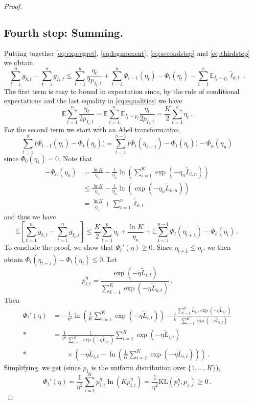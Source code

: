 \documentclass[11pt]{hackednow}
\newcommand{\K}{\mathrm{KL}}
\newcommand{\E}{\mathbb{E}}
\renewcommand{\tilde}{\widetilde}
\begin{document}
\begin{proof}
\subsection*{Fourth step: Summing.}
%
Putting together \eqref{eq:expregret}, \eqref{eq:logmoment}, \eqref{eq:secondstep} and \eqref{eq:thirdstep} we obtain
$$\sum_{t=1}^n g_{k,t} - \sum_{t=1}^n g_{I_t,t} \leq \sum_{t=1}^n \frac{\eta_t}{2 p_{I_t,t}} + \sum_{t=1}^n \Phi_{t-1}(\eta_t) - \Phi_t(\eta_t) - \sum_{t=1}^n \E_{I_t \sim p_t} \tilde{\ell}_{k,t}~.$$
The first term is easy to bound in expectation since, by the rule of conditional expectations and the last equality in \eqref{eq:equalities} we have
$$\E \sum_{t=1}^n \frac{\eta_t}{2 p_{I_t,t}} = \E \sum_{t=1}^n \E_{I_t \sim p_t} \frac{\eta_t}{2 p_{I_t,t}} = \frac{K}{2} \sum_{t=1}^n \eta_t~.$$
For the second term we start with an Abel transformation,
$$\sum_{t=1}^n \bigl(\Phi_{t-1}(\eta_t) - \Phi_t(\eta_t)\bigr) = \sum_{t=1}^{n-1} \bigl(\Phi_t(\eta_{t+1}) - \Phi_t(\eta_t)\bigr) - \Phi_n(\eta_n)$$
since $\Phi_0(\eta_1)=0$. Note that
\begin{align*}
- \Phi_n(\eta_n) & = \frac{\ln K}{\eta_n} - \frac{1}{\eta_n} \ln\left(\sum_{i=1}^K \exp\left(-\eta_n \tilde{L}_{i,n}\right)\right) \\ & \leq \frac{\ln K}{\eta_n} - \frac{1}{\eta_n} \ln\left(\exp\left(-\eta_n \tilde{L}_{k,n}\right)\right)\\
& =  \frac{\ln K}{\eta_n} + \sum_{t=1}^n \tilde{\ell}_{k,t}
\end{align*}
and thus we have
$$\E \left[ \sum_{t=1}^n g_{k,t} - \sum_{t=1}^n g_{I_t,t} \right] \leq \frac{K}{2} \sum_{t=1}^n \eta_t + \frac{\ln K}{\eta_n} + \E \sum_{t=1}^{n-1} \Phi_t(\eta_{t+1}) - \Phi_t(\eta_t)~.$$
To conclude the proof, we show that $\Phi_t'(\eta)\geq 0$. Since $\eta_{t+1}\leq \eta_t$, we then obtain $\Phi_t(\eta_{t+1}) - \Phi_t(\eta_t) \leq 0$. 
Let
\[
    p_{i,t}^{\eta}=\frac{\exp{\left(- \eta \tilde{L}_{i,t}\right)}}{\sum_{k=1}^K \exp{\left(- \eta \tilde{L}_{k,t}\right)}}~.
\]
Then
\begin{align*}
\Phi_t'(\eta) & = - \frac{1}{\eta^2} \ln\left(\frac{1}{K} \sum_{i=1}^K \exp{\left(- \eta \tilde{L}_{i,t}\right)}\right) - \frac{1}{\eta}\frac{\sum_{i=1}^K \tilde{L}_{i,t} \exp{\left(- \eta \tilde{L}_{i,t}\right)}}{\sum_{i=1}^K \exp{\left(- \eta \tilde{L}_{i,t}\right)}} \\*
& = \frac{1}{\eta^2} \frac{1}{\sum_{i=1}^K \exp{\left(- \eta \tilde{L}_{i,t}\right)}} \sum_{i=1}^K \exp{\left(- \eta \tilde{L}_{i,t}\right)} \\*
& \qquad \times \left(-\eta \tilde{L}_{i,t} - \ln\left(\frac{1}{K} \sum_{i=1}^K \exp{\left(- \eta \tilde{L}_{i,t}\right)}\right) \right)~.
\end{align*}
Simplifying, we get (since $p_1$ is the uniform distribution over $\{1,\hdots,K\}$),
\[
\Phi_t'(\eta) = \frac{1}{\eta^2} \sum_{i=1}^K p_{i,t}^{\eta} \ln(K p_{i,t}^{\eta}) = \frac{1}{\eta^2} \K(p_t^{\eta}, p_1) \geq 0~.
\]
\end{proof}
\end{document}
